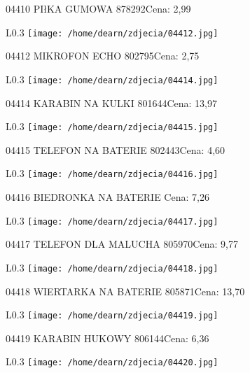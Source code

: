 04410 PIłKA GUMOWA                                   878292Cena: 2,99\newline
\begin{wrapfigure}{L}{0.3\textwidth}
\texttt{[image: /home/dearn/zdjecia/04412.jpg]}
\end{wrapfigure}
04412 MIKROFON ECHO                                  802795Cena: 2,75\newline
\begin{wrapfigure}{L}{0.3\textwidth}
\texttt{[image: /home/dearn/zdjecia/04414.jpg]}
\end{wrapfigure}
04414 KARABIN NA KULKI                                801644Cena: 13,97\newline
\begin{wrapfigure}{L}{0.3\textwidth}
\texttt{[image: /home/dearn/zdjecia/04415.jpg]}
\end{wrapfigure}
04415 TELEFON NA BATERIE                              802443Cena: 4,60\newline
\begin{wrapfigure}{L}{0.3\textwidth}
\texttt{[image: /home/dearn/zdjecia/04416.jpg]}
\end{wrapfigure}
04416 BIEDRONKA NA BATERIE                          Cena: 7,26\newline
\begin{wrapfigure}{L}{0.3\textwidth}
\texttt{[image: /home/dearn/zdjecia/04417.jpg]}
\end{wrapfigure}
04417 TELEFON DLA MALUCHA                             805970Cena: 9,77\newline
\begin{wrapfigure}{L}{0.3\textwidth}
\texttt{[image: /home/dearn/zdjecia/04418.jpg]}
\end{wrapfigure}
04418 WIERTARKA NA BATERIE                            805871Cena: 13,70\newline
\begin{wrapfigure}{L}{0.3\textwidth}
\texttt{[image: /home/dearn/zdjecia/04419.jpg]}
\end{wrapfigure}
04419 KARABIN HUKOWY                                  806144Cena: 6,36\newline
\begin{wrapfigure}{L}{0.3\textwidth}
\texttt{[image: /home/dearn/zdjecia/04420.jpg]}
\end{wrapfigure}
